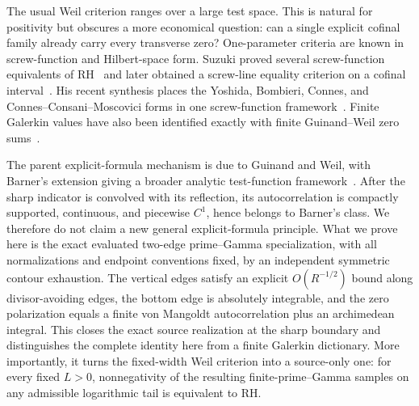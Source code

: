 \documentclass[11pt]{article}
\begin{document}
The usual Weil criterion ranges over a large test space.  This is natural for positivity but
obscures a more economical question: can a single explicit cofinal family already carry every
transverse zero?  One-parameter criteria are known in screw-function and Hilbert-space form.
Suzuki proved several screw-function equivalents of RH~\cite{Suzuki2023} and later obtained a
screw-line equality criterion on a cofinal interval~\cite{Suzuki2025}.  His recent synthesis
places the Yoshida, Bombieri, Connes, and Connes--Consani--Moscovici forms in one screw-function
framework~\cite{Suzuki2026}.  Finite Galerkin values have also been identified exactly with
finite Guinand--Weil zero sums~\cite{Groskin2026}.

The parent explicit-formula mechanism is due to Guinand and Weil, with Barner's extension giving
a broader analytic test-function framework~\cite{Guinand1949,Weil1952,Barner1981}.  After the
sharp indicator is convolved with its reflection, its autocorrelation is compactly supported,
continuous, and piecewise $C^1$, hence belongs to Barner's class.  We therefore do not claim a
new general explicit-formula principle.  What we prove here is the exact evaluated two-edge
prime--Gamma specialization, with all normalizations and endpoint conventions fixed, by an
independent symmetric contour exhaustion.  The vertical edges satisfy an explicit
$O(R^{-1/2})$ bound along divisor-avoiding edges, the bottom edge is absolutely integrable, and
the zero polarization equals a finite von Mangoldt autocorrelation plus an archimedean integral.
This closes the exact source realization at the sharp boundary and distinguishes the complete
identity here from a finite Galerkin dictionary.  More importantly, it turns the fixed-width
Weil criterion into a source-only one: for every fixed $L>0$, nonnegativity of the resulting
finite-prime--Gamma samples on any admissible logarithmic tail is equivalent to RH.
\end{document}
